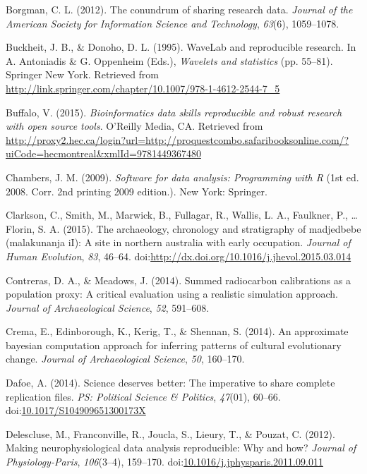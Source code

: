\documentclass[american,man]{apa6}
\begin{document}
Borgman, C. L. (2012). The conundrum of sharing research data.
\emph{Journal of the American Society for Information Science and
Technology}, \emph{63}(6), 1059--1078.

Buckheit, J. B., \& Donoho, D. L. (1995). WaveLab and reproducible
research. In A. Antoniadis \& G. Oppenheim (Eds.), \emph{Wavelets and
statistics} (pp. 55--81). Springer New York. Retrieved from
\url{http://link.springer.com/chapter/10.1007/978-1-4612-2544-7_5}

Buffalo, V. (2015). \emph{Bioinformatics data skills reproducible and
robust research with open source tools}. O'Reilly Media, CA. Retrieved
from
\url{http://proxy2.hec.ca/login?url=http://proquestcombo.safaribooksonline.com/?uiCode=hecmontreal\&xmlId=9781449367480}

Chambers, J. M. (2009). \emph{Software for data analysis: Programming
with R} (1st ed. 2008. Corr. 2nd printing 2009 edition.). New York:
Springer.

Clarkson, C., Smith, M., Marwick, B., Fullagar, R., Wallis, L. A.,
Faulkner, P., \ldots{} Florin, S. A. (2015). The archaeology, chronology
and stratigraphy of madjedbebe (malakunanja iI): A site in northern
australia with early occupation. \emph{Journal of Human Evolution},
\emph{83}, 46--64.
doi:\href{http://dx.doi.org/http://dx.doi.org/10.1016/j.jhevol.2015.03.014}{http://dx.doi.org/10.1016/j.jhevol.2015.03.014}

Contreras, D. A., \& Meadows, J. (2014). Summed radiocarbon calibrations
as a population proxy: A critical evaluation using a realistic
simulation approach. \emph{Journal of Archaeological Science},
\emph{52}, 591--608.

Crema, E., Edinborough, K., Kerig, T., \& Shennan, S. (2014). An
approximate bayesian computation approach for inferring patterns of
cultural evolutionary change. \emph{Journal of Archaeological Science},
\emph{50}, 160--170.

Dafoe, A. (2014). Science deserves better: The imperative to share
complete replication files. \emph{PS: Political Science \& Politics},
\emph{47}(01), 60--66.
doi:\href{http://dx.doi.org/10.1017/S104909651300173X}{10.1017/S104909651300173X}

Delescluse, M., Franconville, R., Joucla, S., Lieury, T., \& Pouzat, C.
(2012). Making neurophysiological data analysis reproducible: Why and
how? \emph{Journal of Physiology-Paris}, \emph{106}(3--4), 159--170.
doi:\href{http://dx.doi.org/10.1016/j.jphysparis.2011.09.011}{10.1016/j.jphysparis.2011.09.011}
\end{document}
